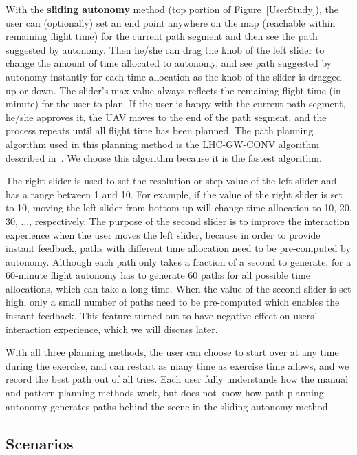 \documentclass[journal]{IEEEtran}
\begin{document}
With the \textbf{sliding autonomy} method (top portion of Figure~\ref{UserStudy}), the user can (optionally) set an end point anywhere on the map (reachable within remaining flight time) for the current path segment and then see the path suggested by autonomy. Then he/she can drag the knob of the left slider to change the amount of time allocated to autonomy, and see path suggested by autonomy instantly for each time allocation as the knob of the slider is dragged up or down. The slider's max value always reflects the remaining flight time (in minute) for the user to plan. If the user is happy with the current path segment, he/she approves it, the UAV moves to the end of the path segment, and the process repeats until all flight time has been planned. The path planning algorithm used in this planning method is the LHC-GW-CONV algorithm described in~\cite{Lin2009UAV, Lin2014Hierarchical}. We choose this algorithm because it is the fastest algorithm.

The right slider is used to set the resolution or step value of the left slider and has a range between 1 and 10. For example, if the value of the right slider is set to 10, moving the left slider from bottom up will change time allocation to 10, 20, 30, ..., respectively. The purpose of the second slider is to improve the interaction experience when the user moves the left slider, because in order to provide instant feedback, paths with different time allocation need to be pre-computed by autonomy. Although each path only takes a fraction of a second to generate, for a 60-minute flight autonomy has to generate 60 paths for all possible time allocations, which can take a long time. When the value of the second slider is set high, only a small number of paths need to be pre-computed which enables the instant feedback. This feature turned out to have negative effect on users' interaction experience, which we will discuss later.

With all three planning methods, the user can choose to start over at any time during the exercise, and can restart as many time as exercise time allows, and we record the best path out of all tries. Each user fully understands how the manual and pattern planning methods work, but does not know how path planning autonomy generates paths behind the scene in the sliding autonomy method.

\subsection{Scenarios}
\end{document}
